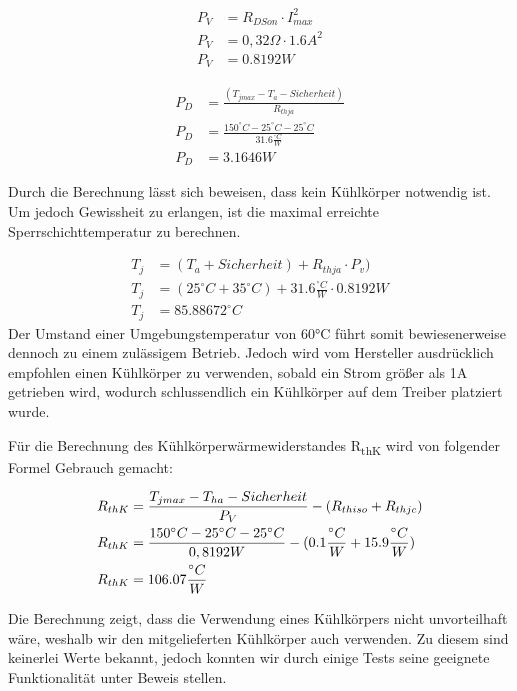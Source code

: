 \begin{align*}
    P_V &= R_{DSon} \cdot I_{max}^2 \\
    P_V &= 0,32\Omega \cdot 1.6A^2 \\
    P_V &= 0.8192W
\end{align*}

\begin{align*}
    P_D &= \frac{(T_{jmax} - T_{a} - Sicherheit)}{R_{thja}} \\
    P_D &= \frac{150^{\circ}C - 25^{\circ}C - 25^{\circ}C}{31.6\frac{{}^{\circ}C}{W}} \\
    P_D &= 3.1646W
\end{align*}

Durch die Berechnung lässt sich beweisen, dass kein Kühlkörper notwendig ist.
Um jedoch Gewissheit zu erlangen, ist die maximal erreichte Sperrschichttemperatur zu berechnen.

\begin{align*}
    T_{j} &= (T_{a}+Sicherheit) + {R_{thja}} \cdot P_{v}) \\
    T_{j} &= (25^{\circ}C + 35^{\circ}C) + 31.6\frac{{}^{\circ}C}{W} \cdot 0.8192W \\
    T_{j} &= 85.88672^{\circ}C
\end{align*}
\newpage
Der Umstand einer Umgebungstemperatur von 60°C führt somit bewiesenerweise dennoch zu einem zulässigem Betrieb.
Jedoch wird vom Hersteller ausdrücklich empfohlen einen Kühlkörper zu verwenden, sobald ein Strom größer als 1A getrieben wird, wodurch schlussendlich ein Kühlkörper auf dem Treiber platziert wurde.

Für die Berechnung des Kühlkörperwärmewiderstandes R\textsubscript{thK} wird von folgender Formel Gebrauch gemacht:

\begin{align}
    R_{thK} &= \frac{T_{jmax} - T_{ha} - Sicherheit}{P_V} - (R_{thiso} + R_{thjc}) \\
    R_{thK} &= \frac{150^{\circ}C - 25^{\circ}C - 25^{\circ}C}{0,8192W} - (0.1\frac{{}^{\circ}C}{W} + 15.9\frac{{}^{\circ}C}{W}) \notag \\
    R_{thK} &= 106.07\frac{{}^{\circ}C}{W}  \notag
\end{align}

Die Berechnung zeigt, dass die Verwendung eines Kühlkörpers nicht unvorteilhaft wäre, weshalb wir den mitgelieferten Kühlkörper auch verwenden.
Zu diesem sind keinerlei Werte bekannt, jedoch konnten wir durch einige Tests seine geeignete Funktionalität unter Beweis stellen.

